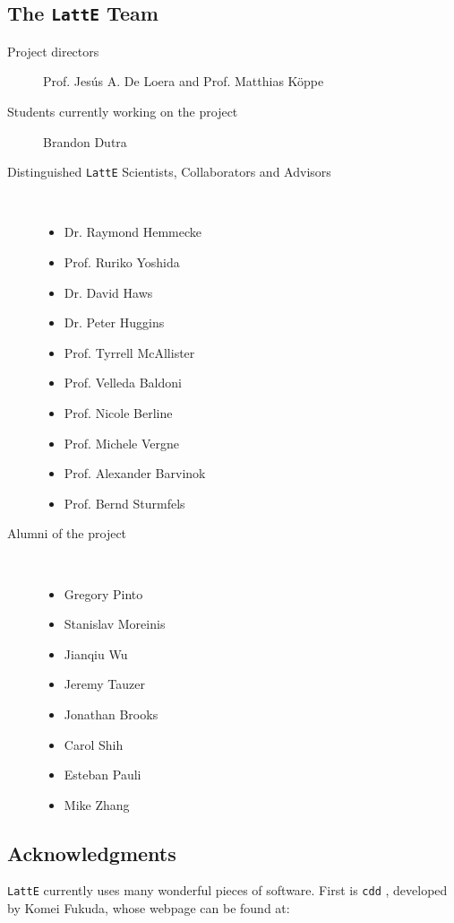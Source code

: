 \documentclass{article}
\newcommand{\latte}{{\tt LattE}\xspace}
\begin{document}
\subsection{The {\tt LattE} Team}
\begin{description}
\item[Project directors]  Prof. Jes\'us A. De Loera and Prof. Matthias K\"oppe
\item[Students currently working on the project] Brandon Dutra
\item[Distinguished \latte Scientists, Collaborators and Advisors] \hfill \\
	\begin{itemize} 
		\item Dr. Raymond Hemmecke
		\item Prof. Ruriko Yoshida
		\item Dr. David Haws
		\item Dr. Peter Huggins
		\item Prof. Tyrrell McAllister
		\item Prof. Velleda Baldoni
		\item Prof. Nicole Berline
		\item Prof. Michele Vergne
		\item Prof. Alexander Barvinok
		\item Prof. Bernd Sturmfels 
	\end{itemize}
\item[Alumni of the project]	\hfill \\
	\begin{itemize}
		\item Gregory Pinto	
		\item Stanislav Moreinis
		\item Jianqiu Wu
		\item Jeremy Tauzer
		\item Jonathan Brooks
		\item Carol Shih
		\item Esteban Pauli
		\item Mike Zhang	
	\end{itemize}
\end{description}

\subsection{Acknowledgments}

\par {\tt LattE} currently uses many wonderful pieces of software.
First is {\tt cdd} \cite{fukuda}, developed by Komei Fukuda, whose webpage can be
found at:
\end{document}
